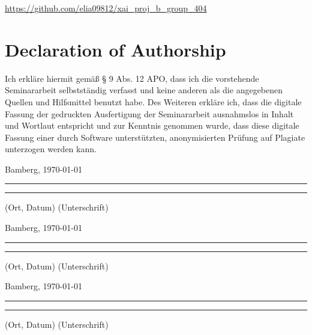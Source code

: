 \documentclass[a4paper]{article}
\begin{document}
\url{https://github.com/elia09812/xai_proj_b_group_404}





{\parindent 0cm
\section*{Declaration of Authorship}
Ich erkläre hiermit gemäß § 9 Abs. 12 APO, dass ich die vorstehende Seminararbeit selbstständig verfasst und keine anderen als die angegebenen Quellen und Hilfsmittel benutzt habe. Des Weiteren erkläre ich, dass die digitale Fassung der gedruckten Ausfertigung der Seminararbeit ausnahmslos in Inhalt und Wortlaut entspricht und zur Kenntnis genommen wurde, dass diese digitale Fassung einer durch Software unterstützten, anonymisierten Prüfung auf Plagiate unterzogen werden kann.\\
\vspace{2\baselineskip}
  
Bamberg, \today

\rule[0.5em]{14em}{0.5pt} \hspace{0.25\linewidth}\rule[0.5em]{14em}{0.5pt}
\vspace{1em}
\hspace{4em} (Ort, Datum) \hspace{0.51\linewidth} (Unterschrift)

Bamberg, \today

\rule[0.5em]{14em}{0.5pt} \hspace{0.25\linewidth}\rule[0.5em]{14em}{0.5pt}
\vspace{1em}
\hspace{4em} (Ort, Datum) \hspace{0.51\linewidth} (Unterschrift)

Bamberg, \today

\rule[0.5em]{14em}{0.5pt} \hspace{0.25\linewidth}\rule[0.5em]{14em}{0.5pt}
\vspace{1em}
\hspace{4em} (Ort, Datum) \hspace{0.51\linewidth} (Unterschrift)
}





\end{document}
